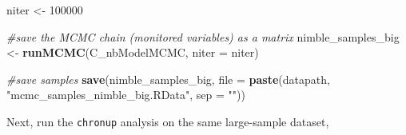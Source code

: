 \documentclass[]{article}
\newenvironment{Shaded}{\begin{snugshade}}{\end{snugshade}}
\newcommand{\KeywordTok}[1]{\textcolor[rgb]{0.13,0.29,0.53}{\textbf{#1}}}
\newcommand{\DataTypeTok}[1]{\textcolor[rgb]{0.13,0.29,0.53}{#1}}
\newcommand{\DecValTok}[1]{\textcolor[rgb]{0.00,0.00,0.81}{#1}}
\newcommand{\StringTok}[1]{\textcolor[rgb]{0.31,0.60,0.02}{#1}}
\newcommand{\CommentTok}[1]{\textcolor[rgb]{0.56,0.35,0.01}{\textit{#1}}}
\newcommand{\NormalTok}[1]{#1}
\begin{document}
\begin{Shaded}
\begin{Highlighting}[]
\NormalTok{niter <-}\StringTok{ }\DecValTok{100000}

\CommentTok{#save the MCMC chain (monitored variables) as a matrix}
\NormalTok{nimble_samples_big <-}\StringTok{ }\KeywordTok{runMCMC}\NormalTok{(C_nbModelMCMC, }\DataTypeTok{niter =}\NormalTok{ niter)}

\CommentTok{#save samples}
\KeywordTok{save}\NormalTok{(nimble_samples_big,}
        \DataTypeTok{file =} \KeywordTok{paste}\NormalTok{(datapath,}
                    \StringTok{"mcmc_samples_nimble_big.RData"}\NormalTok{,}
                    \DataTypeTok{sep =} \StringTok{""}\NormalTok{))}
\end{Highlighting}
\end{Shaded}

Next, run the \texttt{chronup} analysis on the same large-sample
dataset,
\end{document}
